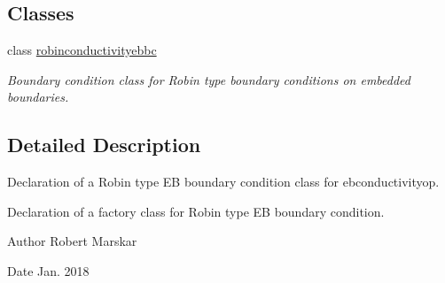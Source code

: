 \subsection*{Classes}
\begin{DoxyCompactItemize}
\item 
class \hyperlink{classrobinconductivityebbc}{robinconductivityebbc}
\begin{DoxyCompactList}\small\item\em Boundary condition class for Robin type boundary conditions on embedded boundaries. \end{DoxyCompactList}\end{DoxyCompactItemize}


\subsection{Detailed Description}
Declaration of a Robin type EB boundary condition class for ebconductivityop. 

Declaration of a factory class for Robin type EB boundary condition.

\begin{DoxyAuthor}{Author}
Robert Marskar 
\end{DoxyAuthor}
\begin{DoxyDate}{Date}
Jan. 2018 
\end{DoxyDate}
